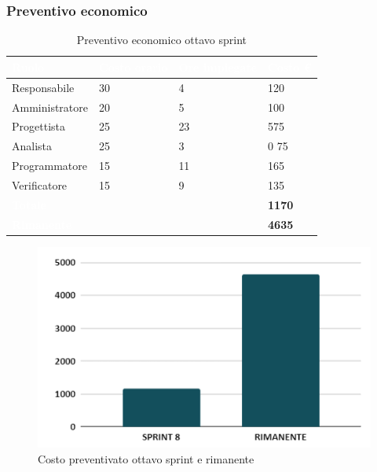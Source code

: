 \newpage

\subsubsection{Preventivo economico}

{
\setlength{\tabcolsep}{10pt}
\renewcommand{\arraystretch}{1.5}
\begin{table}[h]
    \centering
    \begin{tabularx}{\textwidth}{| l | l | l | X |}
        \hline
        \rowcolor{headerrow} \textbf{\textcolor{white}{Ruolo}} & \textbf{\textcolor{white}{Costo orario}} & \textbf{\textcolor{white}{Ore impiegate}} & \textbf{\textcolor{white}{Costo €}} \\
        \hline
        Responsabile & 30 & 4 & 120\\
        \hline
        Amministratore & 20 & 5 & 100\\
        \hline
        Progettista& 25 & 23  & 575\\
        \hline
        Analista & 25 & 3& 0 75\\
        \hline
        Programmatore & 15 & 11 & 165\\
        \hline
        Verificatore & 15 & 9 & 135\\
        \hline
        \cellcolor{headerrow} \textbf{\textcolor{white}{Totale}} &  &  & \textbf{1170}\\
        \hline
        \cellcolor{headerrow} \textbf{\textcolor{white}{Rimanente}} &  &  & \textbf{4635}\\
        \hline
    \end{tabularx}
    \caption{Preventivo economico ottavo sprint}
    \label{tab:preventivocostiottavosprint}
\end{table}
}

\begin{figure}[h!]
    \centering
    \includegraphics[width=\textwidth]{prev8costo.png}
    \caption{Costo preventivato ottavo sprint e rimanente}
    \label{fig:preventivocostoottavosprint}
\end{figure}


\newpage